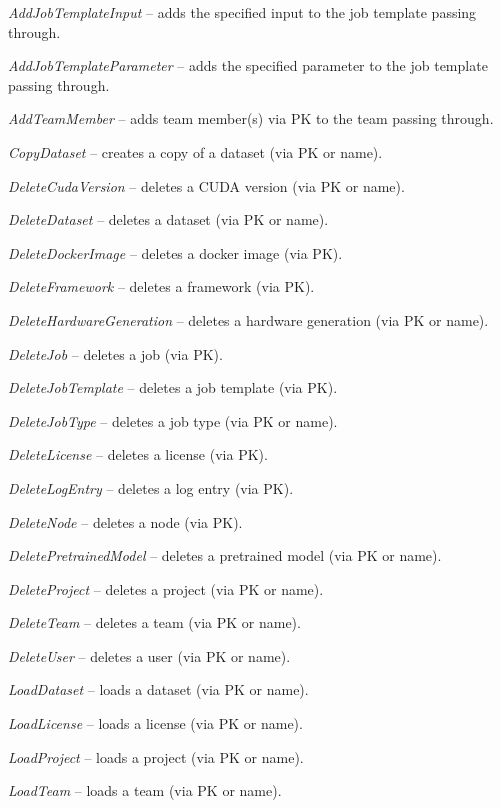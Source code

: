 \documentclass[a4paper]{book}
\begin{document}
\begin{tight_itemize}
  \item \textit{AddJobTemplateInput} -- adds the specified input to the job template passing through.
  \item \textit{AddJobTemplateParameter} -- adds the specified parameter to the job template passing through.
  \item \textit{AddTeamMember} -- adds team member(s) via PK to the team passing through.
  \item \textit{CopyDataset} -- creates a copy of a dataset (via PK or name).
  \item \textit{DeleteCudaVersion} -- deletes a CUDA version (via PK or name).
  \item \textit{DeleteDataset} -- deletes a dataset (via PK or name).
  \item \textit{DeleteDockerImage} -- deletes a docker image (via PK).
  \item \textit{DeleteFramework} -- deletes a framework (via PK).
  \item \textit{DeleteHardwareGeneration} -- deletes a hardware generation (via PK or name).
  \item \textit{DeleteJob} -- deletes a job (via PK).
  \item \textit{DeleteJobTemplate} -- deletes a job template (via PK).
  \item \textit{DeleteJobType} -- deletes a job type (via PK or name).
  \item \textit{DeleteLicense} -- deletes a license (via PK).
  \item \textit{DeleteLogEntry} -- deletes a log entry (via PK).
  \item \textit{DeleteNode} -- deletes a node (via PK).
  \item \textit{DeletePretrainedModel} -- deletes a pretrained model (via PK or name).
  \item \textit{DeleteProject} -- deletes a project (via PK or name).
  \item \textit{DeleteTeam} -- deletes a team (via PK or name).
  \item \textit{DeleteUser} -- deletes a user (via PK or name).
  \item \textit{LoadDataset} -- loads a dataset (via PK or name).
  \item \textit{LoadLicense} -- loads a license (via PK or name).
  \item \textit{LoadProject} -- loads a project (via PK or name).
  \item \textit{LoadTeam} -- loads a team (via PK or name).

\end{tight_itemize}
\end{document}
